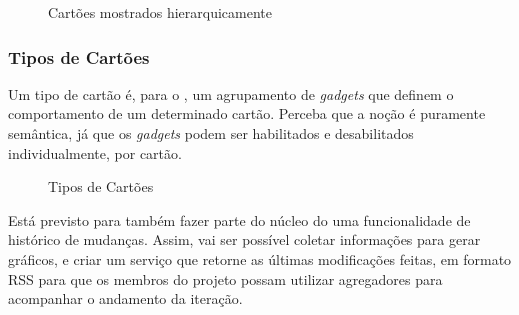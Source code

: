 \begin{figure}[H]
  \centering
  \caption{Cartões mostrados hierarquicamente}\label{figura:hierarquia}
\end{figure}

\subsubsection*{Tipos de Cartões}

Um tipo de cartão é, para o \calopsita{}, um agrupamento de \textit{gadgets} que definem o comportamento de um determinado cartão. Perceba que a noção é puramente semântica, já que os \textit{gadgets} podem ser habilitados e desabilitados individualmente, por cartão.

\begin{figure}[H]
  \centering
  \caption{Tipos de Cartões}\label{figura:tipo_cartao}
\end{figure}


Está previsto para também fazer parte do núcleo do \calopsita{} uma funcionalidade de histórico de mudanças. Assim, vai ser possível coletar informações para gerar gráficos, e criar um serviço que retorne as últimas modificações feitas, em formato RSS para que os membros do projeto possam utilizar agregadores para acompanhar o andamento da iteração.


